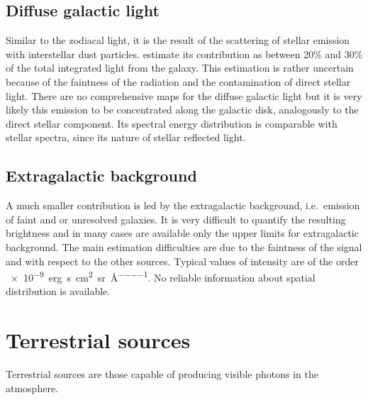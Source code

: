 \subsection{Diffuse galactic light}
Similar to the zodiacal light, it is the result of the scattering of stellar emission with interstellar dust particles. \cite{leinert19981997} estimate its contribution as between 20\% and 30\% of the total integrated light from the galaxy. This estimation is rather uncertain because of the faintness of the radiation and the contamination of direct stellar light. There are no comprehensive maps for the diffuse galactic light but it is very likely this emission to be concentrated along the galactic disk, analogously to the direct stellar component. Its spectral energy distribution is comparable with stellar spectra, since its nature of stellar reflected light.

\subsection{Extragalactic background}
A much smaller contribution is led by the extragalactic background, i.e.\ emission of faint and or unresolved galaxies. It is very difficult to quantify the resulting brightness and in many cases are available only the upper limits for extragalactic background. The main estimation difficulties are due to the faintness of the signal and with respect to the other sources. Typical values of intensity are of the order \SI{e-9}{erg\per\second \per\centi\metre\squared \per\steradian\per\angstrom}. No reliable information about spatial distribution is available.

\section{Terrestrial sources}
Terrestrial sources are those capable of producing visible photons in the atmosphere.

